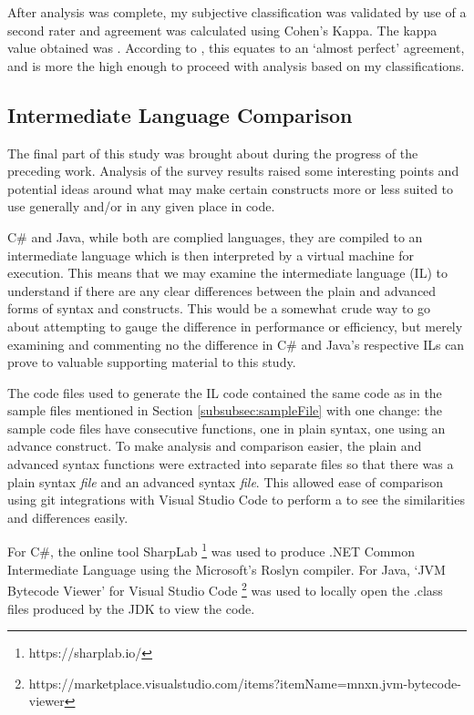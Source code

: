 \documentclass{article}
\begin{document}
        After analysis was complete, my subjective classification was validated by use of a second rater and agreement was calculated using Cohen's Kappa. The kappa value obtained was . According to \cite{cohensKappa}, this equates to an `almost perfect' agreement, and is more the high enough to proceed with analysis based on my classifications.

    \subsection{Intermediate Language Comparison}
        The final part of this study was brought about during the progress of the preceding work. Analysis of the survey results raised some interesting points and potential ideas around what may make certain constructs more or less suited to use generally and/or in any given place in code.

        C\# and Java, while both are complied languages, they are compiled to an intermediate language which is then interpreted by a virtual machine for execution. This means that we may examine the intermediate language (IL) to understand if there are any clear differences between the plain and advanced forms of syntax and constructs. This would be a somewhat crude way to go about attempting to gauge the difference in performance or efficiency, but merely examining and commenting no the difference in C\# and Java's respective ILs can prove to valuable supporting material to this study.
        
        The code files used to generate the IL code contained the same code as in the sample files mentioned in Section \ref{subsubsec:sampleFile} with one change: the sample code files have consecutive functions, one in plain syntax, one using an advance construct. To make analysis and comparison easier, the plain and advanced syntax functions were extracted into separate files so that there was a plain syntax \emph{file} and an advanced syntax \emph{file}. This allowed ease of comparison using git integrations with Visual Studio Code to perform a  to see the similarities and differences easily. 

        For C\#, the online tool SharpLab \footnote{https://sharplab.io/} was used to produce .NET Common Intermediate Language using the Microsoft's Roslyn  compiler. For Java, `JVM Bytecode Viewer' for Visual Studio Code \footnote{https://marketplace.visualstudio.com/items?itemName=mnxn.jvm-bytecode-viewer} was used to locally open the .class files produced by the JDK to view the code.
\end{document}
